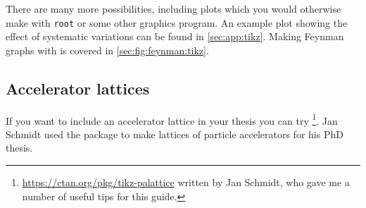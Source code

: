 There are many more possibilities,
including plots which you would otherwise make with \texttt{root} or
some other graphics program. An example plot showing the effect of
systematic variations can be found in \cref{sec:app:tikz}. Making
Feynman graphs with \TikZ is covered in \cref{sec:fig:feynman:tikz}.


\subsection{Accelerator lattices}%
\label{sec:fig:accelerator}

If you want to include an accelerator lattice in your thesis you can try
\footnote{%
  \url{https://ctan.org/pkg/tikz-palattice}
written by Jan Schmidt, who gave me a number of useful tips for this guide.}.
Jan Schmidt used the package to make lattices of particle accelerators for his PhD thesis.

